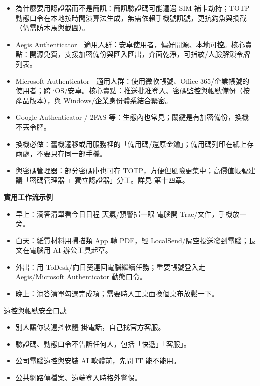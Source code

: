 
\begin{itemize}
  \item 為什麼要用認證器而不是簡訊：簡訊驗證碼可能遭遇 SIM 補卡劫持；TOTP 動態口令在本地按時間演算法生成，無需依賴手機號訊號，更抗釣魚與攔截（仍需防木馬與截圖）。
  \item Aegis Authenticator　適用人群：安卓使用者，偏好開源、本地可控。核心賣點：開源免費，支援加密備份與匯入匯出，介面乾淨，可指紋/人臉解鎖令牌列表。
  \item Microsoft Authenticator　適用人群：使用微軟帳號、Office 365/企業帳號的使用者；跨 iOS/安卓。核心賣點：推送批准登入、密碼監控與帳號備份（按產品版本），與 Windows/企業身份體系結合緊密。
  \item Google Authenticator / 2FAS 等：生態內也常見；關鍵是有加密備份，換機不丟令牌。
  \item 換機必做：舊機遷移或用服務裡的「備用碼/還原金鑰」；備用碼列印在紙上存兩處，不要只存同一部手機。
  \item 與密碼管理器：部分密碼庫也可存 TOTP，方便但風險更集中；高價值帳號建議「密碼管理器 + 獨立認證器」分工。詳見 第十四章。
\end{itemize}


\textbf{實用工作流示例}\par

\begin{itemize}
  \item 早上：滴答清單看今日日程 天氣/預警掃一眼 電腦開 Trae/文件，手機放一旁。
  \item 白天：紙質材料用掃描類 App 轉 PDF，經 LocalSend/隔空投送發到電腦；長文在電腦用 AI 辦公工具起草。
  \item 外出：用 ToDesk/向日葵連回電腦繼續任務；重要帳號登入走 Aegis/Microsoft Authenticator 動態口令。
  \item 晚上：滴答清單勾選完成項；需要時人工桌面換個桌布放鬆一下。
\end{itemize}

\begin{tcbwarn}{遠控與帳號安全口訣}
\begin{itemize}
  \item 別人讓你裝遠控軟體 掛電話，自己找官方客服。
  \item 驗證碼、動態口令不告訴任何人，包括「快遞」「客服」。
  \item 公司電腦遠控與安裝 AI 軟體前，先問 IT 能不能用。
  \item 公共網路傳檔案、遠端登入時格外警惕。
\end{itemize}

\end{tcbwarn}

